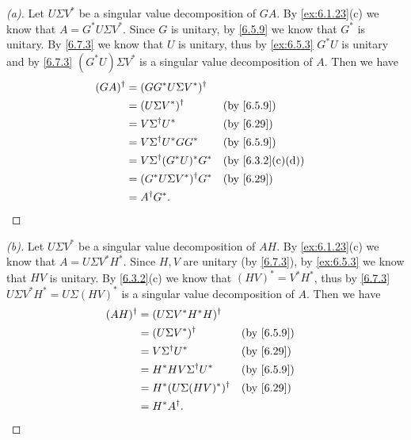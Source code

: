 \begin{proof}[(a)]
  Let \(U \Sigma V^*\) be a singular value decomposition of \(GA\).
  By \cref{ex:6.1.23}(c) we know that \(A = G^* U \Sigma V^*\).
  Since \(G\) is unitary, by \cref{6.5.9} we know that \(G^*\) is unitary.
  By \cref{6.7.3} we know that \(U\) is unitary, thus by \cref{ex:6.5.3} \(G^* U\) is unitary and by \cref{6.7.3} \((G^* U) \Sigma V^*\) is a singular value decomposition of \(A\).
  Then we have
  \begin{align*}
    (GA)^{\dag} & = (G G^* U \Sigma V^*)^{\dag}                        \\
                & = (U \Sigma V^*)^{\dag}         &  & \by{6.5.9}      \\
                & = V \Sigma^{\dag} U^*           &  & \by{6.29}       \\
                & = V \Sigma^{\dag} U^* G G^*     &  & \by{6.5.9}      \\
                & = V \Sigma^{\dag} (G^* U)^* G^* &  & \by{6.3.2}[c,d] \\
                & = (G^* U \Sigma V^*)^{\dag} G^* &  & \by{6.29}       \\
                & = A^{\dag} G^*.
  \end{align*}
\end{proof}

\begin{proof}[(b)]
  Let \(U \Sigma V^*\) be a singular value decomposition of \(AH\).
  By \cref{ex:6.1.23}(c) we know that \(A = U \Sigma V^* H^*\).
  Since \(H, V\) are unitary (by \cref{6.7.3}), by \cref{ex:6.5.3} we know that \(HV\) is unitary.
  By \cref{6.3.2}(c) we know that \((HV)^* = V^* H^*\), thus by \cref{6.7.3} \(U \Sigma V^* H^* = U \Sigma (HV)^*\) is a singular value decomposition of \(A\).
  Then we have
  \begin{align*}
    (AH)^{\dag} & = (U \Sigma V^* H^* H)^{\dag}                  \\
                & = (U \Sigma V^*)^{\dag}        &  & \by{6.5.9} \\
                & = V \Sigma^{\dag} U^*          &  & \by{6.29}  \\
                & = H^* H V \Sigma^{\dag} U^*    &  & \by{6.5.9} \\
                & = H^* (U \Sigma (HV)^*)^{\dag} &  & \by{6.29}  \\
                & = H^* A^{\dag}.
  \end{align*}
\end{proof}

